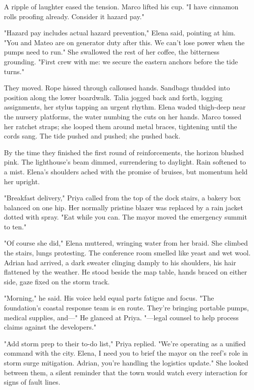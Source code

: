 A ripple of laughter eased the tension. Marco lifted his cup. "I have cinnamon rolls proofing already. Consider it hazard pay."

"Hazard pay includes actual hazard prevention," Elena said, pointing at him. "You and Mateo are on generator duty after this. We can't lose power when the pumps need to run." She swallowed the rest of her coffee, the bitterness grounding. "First crew with me: we secure the eastern anchors before the tide turns."

They moved. Rope hissed through calloused hands. Sandbags thudded into position along the lower boardwalk. Talia jogged back and forth, logging assignments, her stylus tapping an urgent rhythm. Elena waded thigh-deep near the nursery platforms, the water numbing the cuts on her hands. Marco tossed her ratchet straps; she looped them around metal braces, tightening until the cords sang. The tide pushed and pushed; she pushed back.

By the time they finished the first round of reinforcements, the horizon blushed pink. The lighthouse's beam dimmed, surrendering to daylight. Rain softened to a mist. Elena's shoulders ached with the promise of bruises, but momentum held her upright.

"Breakfast delivery," Priya called from the top of the dock stairs, a bakery box balanced on one hip. Her normally pristine blazer was replaced by a rain jacket dotted with spray. "Eat while you can. The mayor moved the emergency summit to ten."

"Of course she did," Elena muttered, wringing water from her braid. She climbed the stairs, lungs protesting. The conference room smelled like yeast and wet wool. Adrian had arrived, a dark sweater clinging damply to his shoulders, his hair flattened by the weather. He stood beside the map table, hands braced on either side, gaze fixed on the storm track.

"Morning," he said. His voice held equal parts fatigue and focus. "The foundation's coastal response team is en route. They're bringing portable pumps, medical supplies, and—" He glanced at Priya. "—legal counsel to help process claims against the developers."

"Add storm prep to their to-do list," Priya replied. "We're operating as a unified command with the city. Elena, I need you to brief the mayor on the reef's role in storm surge mitigation. Adrian, you're handling the logistics update." She looked between them, a silent reminder that the town would watch every interaction for signs of fault lines.

